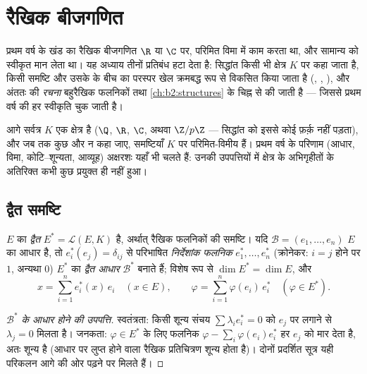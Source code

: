 \chapter{रैखिक बीजगणित}\label{ch:b2:linalg}

प्रथम वर्ष के खंड का रैखिक बीजगणित $\R$ या $\C$ पर, परिमित विमा में काम
करता था, और सामान्य  को स्वीकृत मान लेता था। यह अध्याय तीनों
प्रतिबंध हटा देता है: सिद्धांत किसी भी क्षेत्र $K$ पर कहा जाता है, किसी
समष्टि और उसके \emph{} के बीच का परस्पर खेल क्रमबद्ध रूप से विकसित
किया जाता है (, , ), और अंततः  की
\emph{रचना}  बहुरैखिक फलनिकों तथा \cref{ch:b2:structures} के चिह्न से की जाती है ---
जिससे प्रथम वर्ष की हर स्वीकृति चुक जाती है।

आगे सर्वत्र $K$ एक क्षेत्र है ($\Q$, $\R$, $\C$, अथवा $\Z/p\Z$ --- सिद्धांत को
इससे कोई फ़र्क़ नहीं पड़ता), और जब तक कुछ और न कहा जाए, समष्टियाँ $K$ पर
परिमित-विमीय हैं। प्रथम वर्ष के परिणाम (आधार, विमा, कोटि--शून्यता,
आव्यूह) अक्षरशः यहाँ भी चलते हैं: उनकी उपपत्तियों में क्षेत्र के
अभिगृहीतों के अतिरिक्त कभी कुछ प्रयुक्त ही नहीं हुआ।

\section{द्वैत समष्टि}

\begin{definition}[द्वैत समष्टि, द्वैत आधार]\label{def:b2:linalg:dual}
$E$ का \emph{द्वैत} $E^* = \mathcal{L}(E,
K)$ है, अर्थात् रैखिक फलनिकों
की समष्टि। यदि $\mathcal{B} = (e_1, \dots, e_n)$ $E$ का आधार है, तो $e_i^*(e_j) = \delta_{ij}$ से परिभाषित
\emph{निर्देशांक फलनिक} $e_1^*, \dots, e_n^*$ (क्रोनेकर: $i = j$ होने पर $1$, अन्यथा $0$)
$E^*$ का \emph{द्वैत आधार} $\mathcal{B}^*$ बनाते हैं; विशेष रूप
से $\dim E^* = \dim E$, और
\[
x = \sum_{i=1}^{n} e_i^*(x)\, e_i \quad (x \in E),
\qquad
\varphi = \sum_{i=1}^{n} \varphi(e_i)\, e_i^* \quad (\varphi \in
E^*).
\]
\end{definition}

\begin{proof}[$\mathcal{B}^*$ के आधार होने की उपपत्ति]
स्वतंत्रता: किसी शून्य संचय $\sum \lambda_i e_i^* = 0$ को $e_j$ पर लगाने से $\lambda_j = 0$ मिलता है।
जनकता: $\varphi \in E^*$ के लिए फलनिक $\varphi - \sum_i \varphi(e_i) e_i^*$ हर $e_j$ को मार देता है, अतः शून्य है
(आधार पर लुप्त होने वाला रैखिक प्रतिचित्रण शून्य होता है)। दोनों
प्रदर्शित सूत्र यही परिकलन आगे की ओर पढ़ने पर मिलते हैं।
\end{proof}

